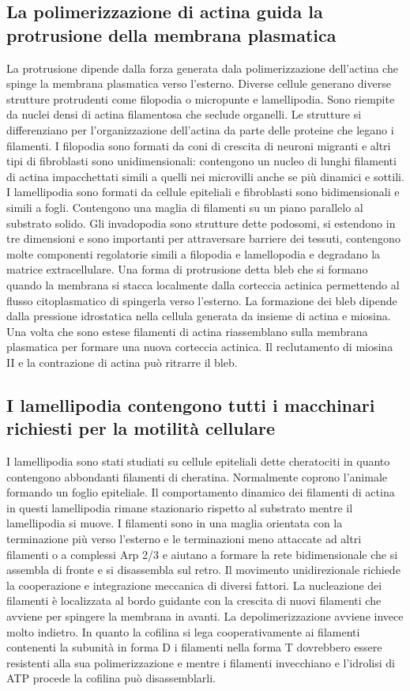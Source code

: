 \subsection{La polimerizzazione di actina guida la protrusione della membrana plasmatica}
La protrusione dipende dalla forza generata dala polimerizzazione dell'actina che spinge la membrana plasmatica verso l'esterno. Diverse cellule generano diverse strutture protrudenti
come filopodia o micropunte e lamellipodia. Sono riempite da nuclei densi di actina filamentosa che seclude organelli. Le strutture si differenziano per l'organizzazione dell'actina da
parte delle proteine che legano i filamenti. I filopodia sono formati da coni di crescita di neuroni migranti e altri tipi di fibroblasti sono unidimensionali: contengono un nucleo di
lunghi filamenti di actina impacchettati simili a quelli nei microvilli anche se pi\`u dinamici e sottili. I lamellipodia sono formati da cellule epiteliali e fibroblasti sono 
bidimensionali e simili a fogli. Contengono una maglia di filamenti su un piano parallelo al substrato solido. Gli invadopodia sono strutture dette podosomi, si estendono in tre 
dimensioni e sono importanti per attraversare barriere dei tessuti, contengono molte componenti regolatorie simili a filopodia e lamellopodia e degradano la matrice extracellulare. 
Una forma di protrusione detta bleb che si formano quando la membrana si stacca localmente dalla corteccia actinica permettendo al flusso citoplasmatico di spingerla verso l'esterno. 
La formazione dei bleb dipende dalla pressione idrostatica nella cellula generata da insieme di actina e miosina. Una volta che sono estese filamenti di actina riassemblano sulla 
membrana plasmatica per formare una nuova corteccia actinica. Il reclutamento di miosina II e la contrazione di actina pu\`o ritrarre il bleb. 
\subsection{I lamellipodia contengono tutti i macchinari richiesti per la motilit\`a cellulare}
I lamellipodia sono stati studiati su cellule epiteliali dette cheratociti in quanto contengono abbondanti filamenti di cheratina. Normalmente coprono l'animale formando un foglio 
epiteliale. Il comportamento dinamico dei filamenti di actina in questi lamellipodia rimane stazionario rispetto al substrato mentre il lamellipodia si muove. I filamenti sono in una
maglia orientata con la terminazione pi\`u verso l'esterno e le terminazioni meno attaccate ad altri filamenti o a complessi Arp 2/3 e aiutano a formare la rete bidimensionale che 
si assembla di fronte e si disassembla sul retro. Il movimento unidirezionale richiede la cooperazione e integrazione meccanica di diversi fattori. La nucleazione dei filamenti \`e
localizzata al bordo guidante con la crescita di nuovi filamenti che avviene per spingere la membrana in avanti. La depolimerizzazione avviene invece molto indietro. In quanto la 
cofilina si lega cooperativamente ai filamenti contenenti la subunit\`a in forma D i filamenti nella forma T dovrebbero essere resistenti alla sua polimerizzazione e mentre i filamenti
invecchiano e l'idrolisi di ATP procede la cofilina pu\`o disassemblarli. 
